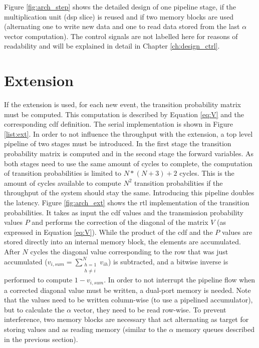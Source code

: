 \documentclass[mscthesis]{usiinfthesis}
\begin{document}
Figure \ref{fig:arch_step} shows the detailed design of one pipeline stage, if
the multiplication unit (\gls{dsp} slice) is reused and if two memory blocks
are used (alternating one to write new data and one to read data stored from
the last $\alpha$ vector computation). The control signals are not labelled here
for reasons of readability and will be explained in detail in Chapter
\ref{ch:design_ctrl}.

\section{Extension}
\label{ch:design_ext}

If the extension is used, for each new event, the transition probability matrix
must be computed. This computation is described by Equation \ref{eq:V} and the
corresponding \gls{cdf} definition. The serial implementation is shown in
Figure \ref{list:ext}. In order to not influence the throughput with the
extension, a top level pipeline of two stages must be introduced. In the first
stage the transition probability matrix is computed and in the second stage the
forward variables. As both stages need to use the same amount of cycles to
complete, the computation of transition probabilities is limited to $N*(N+3)+2$
cycles. This is the amount of cycles available to compute $N^2$ transition
probabilities if the throughput of the system should stay the same. Introducing
this pipeline doubles the latency. Figure \ref{fig:arch_ext} shows the
\gls{rtl} implementation of the transition probabilities. It takes as input the
\gls{cdf} values and the transmission probability values $P$ and performs the
correction of the diagonal of the matrix $V$ (as expressed in Equation
\ref{eq:V}). While the product of the \gls{cdf} and the $P$ values are stored
directly into an internal memory block, the elements are accumulated. After $N$
cycles the diagonal value corresponding to the row that was just accumulated
($v_{i, sum} = \sum\limits_{\substack{h=1 \\ h \neq i}}^{N} v_{ih}$) is
subtracted, and a bitwise inverse is performed to compute $1 - v_{i, sum}$. In
order to not interrupt the pipeline flow when a corrected diagonal value must
be written, a dual-port memory is needed. Note that the values need to be
written column-wise (to use a pipelined accumulator), but to calculate the
$\alpha$ vector, they need to be read row-wise. To prevent interference, two
memory blocks are necessary that act alternating as target for storing values
and as reading memory (similar to the $\alpha$ memory queues described in the
previous section).
\end{document}
